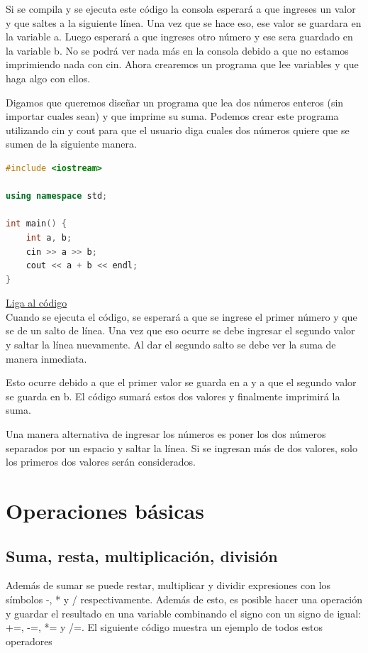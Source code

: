 \documentclass{article}
\begin{document}
Si se compila y se ejecuta este código la consola esperará a que ingreses un valor y que saltes a la siguiente línea. Una vez que se hace eso, ese valor se guardara en la variable a. Luego esperará a que ingreses otro número y ese sera guardado en la variable b. No se podrá ver nada más en la consola debido a que no estamos imprimiendo nada con cin. Ahora crearemos un programa que lee variables y que haga algo con ellos.

Digamos que queremos diseñar un programa que lea dos números enteros (sin importar cuales sean) y que imprime su suma. Podemos crear este programa utilizando cin y cout para que el usuario diga cuales dos números quiere que se sumen de la siguiente manera.

\begin{lstlisting}[language=C++, title=Suma]
#include <iostream>

using namespace std;

int main() {
	int a, b;
	cin >> a >> b;
	cout << a + b << endl;
}
\end{lstlisting}
\href{https://repl.it/@Jamesscn/Suma}{Liga al código}\\

Cuando se ejecuta el código, se esperará a que se ingrese el primer número y que se de un salto de línea. Una vez que eso ocurre se debe ingresar el segundo valor y saltar la línea nuevamente. Al dar el segundo salto se debe ver la suma de manera inmediata.

Esto ocurre debido a que el primer valor se guarda en a y a que el segundo valor se guarda en b. El código sumará estos dos valores y finalmente imprimirá la suma.

Una manera alternativa de ingresar los números es poner los dos números separados por un espacio y saltar la línea. Si se ingresan más de dos valores, solo los primeros dos valores serán considerados.

\section{Operaciones básicas}

\subsection{Suma, resta, multiplicación, división}

Además de sumar se puede restar, multiplicar y dividir expresiones con los símbolos -, * y / respectivamente. Además de esto, es posible hacer una operación y guardar el resultado en una variable combinando el signo con un signo de igual: +=, -=, *= y /=. El siguiente código muestra un ejemplo de todos estos operadores
\end{document}
